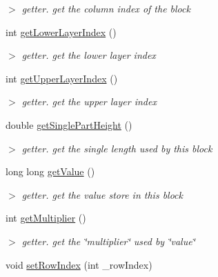 \begin{DoxyCompactItemize}
\begin{DoxyCompactList}\small\item\em $>$ getter. get the column index of the block \end{DoxyCompactList}\item 
\hypertarget{classBlock_a2e1b3d6d31cd7aba4576a74524b6008c}{int \hyperlink{classBlock_a2e1b3d6d31cd7aba4576a74524b6008c}{get\-Lower\-Layer\-Index} ()}\label{classBlock_a2e1b3d6d31cd7aba4576a74524b6008c}

\begin{DoxyCompactList}\small\item\em $>$ getter. get the lower layer index \end{DoxyCompactList}\item 
\hypertarget{classBlock_a478e5c8832f9d89b7691f139c90c409c}{int \hyperlink{classBlock_a478e5c8832f9d89b7691f139c90c409c}{get\-Upper\-Layer\-Index} ()}\label{classBlock_a478e5c8832f9d89b7691f139c90c409c}

\begin{DoxyCompactList}\small\item\em $>$ getter. get the upper layer index \end{DoxyCompactList}\item 
\hypertarget{classBlock_a53c43ce4c0dfb5b21df780221f6e3515}{double \hyperlink{classBlock_a53c43ce4c0dfb5b21df780221f6e3515}{get\-Single\-Part\-Height} ()}\label{classBlock_a53c43ce4c0dfb5b21df780221f6e3515}

\begin{DoxyCompactList}\small\item\em $>$ getter. get the single length used by this block \end{DoxyCompactList}\item 
\hypertarget{classBlock_a84a48a65e4fa30689ed86b55fd5719d1}{long long \hyperlink{classBlock_a84a48a65e4fa30689ed86b55fd5719d1}{get\-Value} ()}\label{classBlock_a84a48a65e4fa30689ed86b55fd5719d1}

\begin{DoxyCompactList}\small\item\em $>$ getter. get the value store in this block \end{DoxyCompactList}\item 
\hypertarget{classBlock_aca5dc7b45373d87734ac76205449def5}{int \hyperlink{classBlock_aca5dc7b45373d87734ac76205449def5}{get\-Multiplier} ()}\label{classBlock_aca5dc7b45373d87734ac76205449def5}

\begin{DoxyCompactList}\small\item\em $>$ getter. get the \char`\"{}multiplier\char`\"{} used by \char`\"{}value\char`\"{} \end{DoxyCompactList}\item 
\hypertarget{classBlock_a0fe6984afe770ad046e0ffbe33398187}{void \hyperlink{classBlock_a0fe6984afe770ad046e0ffbe33398187}{set\-Row\-Index} (int \-\_\-row\-Index)}\label{classBlock_a0fe6984afe770ad046e0ffbe33398187}


\end{DoxyCompactItemize}
